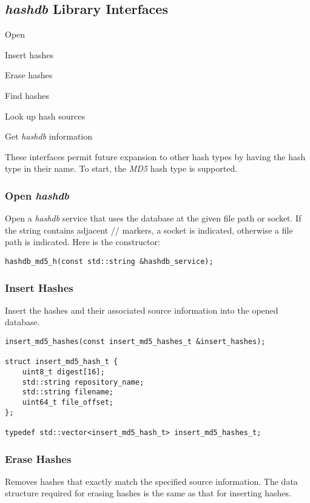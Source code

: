 \documentclass[12pt,twoside]{article}
\newcommand{\hdb}{\emph{hashdb}\xspace}
\begin{document}
\subsection{\hdb Library Interfaces}
\begin{compactitem}
\item Open
\item Insert hashes
\item Erase hashes
\item Find hashes
\item Look up hash sources
\item Get \hdb information
\end{compactitem}

These interfaces permit future expansion to other hash types
by having the hash type in their name.
To start, the \emph{MD5} hash type is supported.

\subsubsection{Open \hdb}
Open a \hdb service that uses the database at the given file path or socket.
If the string contains adjacent // markers, a socket is indicated,
otherwise a file path is indicated.
Here is the constructor:
\begin{small}
\begin{verbatim}
hashdb_md5_h(const std::string &hashdb_service);
\end{verbatim}
\end{small}

\subsubsection{Insert Hashes}
Insert the hashes and their associated source information
into the opened database.
\begin{small}
\begin{verbatim}
insert_md5_hashes(const insert_md5_hashes_t &insert_hashes);

struct insert_md5_hash_t {
    uint8_t digest[16];
    std::string repository_name;
    std::string filename;
    uint64_t file_offset;
};

typedef std::vector<insert_md5_hash_t> insert_md5_hashes_t;
\end{verbatim}
\end{small}

\subsubsection{Erase Hashes}
Removes hashes that exactly match the specified source information.
The data structure required for erasing hashes
is the same as that for inserting hashes.
\end{document}
